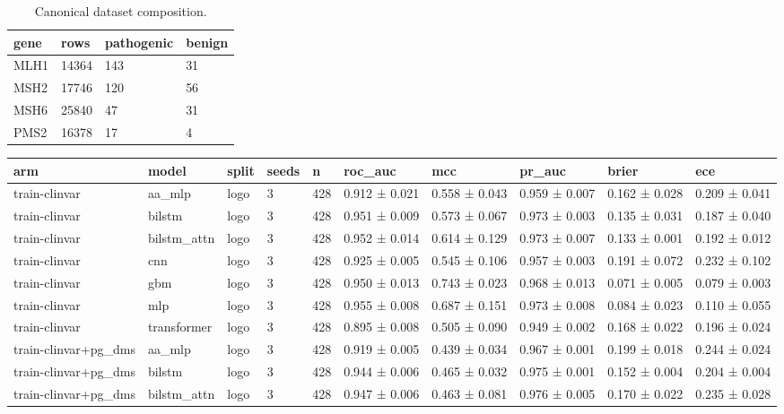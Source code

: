 \begin{table}[t]
\centering
\small
\begin{tabular}{llll}
\toprule
gene & rows & pathogenic & benign \\
\midrule
MLH1 & 14364 & 143 & 31 \\
MSH2 & 17746 & 120 & 56 \\
MSH6 & 25840 & 47 & 31 \\
PMS2 & 16378 & 17 & 4 \\
\bottomrule
\end{tabular}
\caption{Canonical dataset composition.}
\label{tab:composition}
\end{table}

\begin{table}[t]
\centering
\small
\begin{tabular}{llllllllll}
\toprule
arm & model & split & seeds & n & roc\_auc & mcc & pr\_auc & brier & ece \\
\midrule
train-clinvar & aa\_mlp & logo & 3 & 428 & 0.912 ± 0.021 & 0.558 ± 0.043 & 0.959 ± 0.007 & 0.162 ± 0.028 & 0.209 ± 0.041 \\
train-clinvar & bilstm & logo & 3 & 428 & 0.951 ± 0.009 & 0.573 ± 0.067 & 0.973 ± 0.003 & 0.135 ± 0.031 & 0.187 ± 0.040 \\
train-clinvar & bilstm\_attn & logo & 3 & 428 & 0.952 ± 0.014 & 0.614 ± 0.129 & 0.973 ± 0.007 & 0.133 ± 0.001 & 0.192 ± 0.012 \\
train-clinvar & cnn & logo & 3 & 428 & 0.925 ± 0.005 & 0.545 ± 0.106 & 0.957 ± 0.003 & 0.191 ± 0.072 & 0.232 ± 0.102 \\
train-clinvar & gbm & logo & 3 & 428 & 0.950 ± 0.013 & 0.743 ± 0.023 & 0.968 ± 0.013 & 0.071 ± 0.005 & 0.079 ± 0.003 \\
train-clinvar & mlp & logo & 3 & 428 & 0.955 ± 0.008 & 0.687 ± 0.151 & 0.973 ± 0.008 & 0.084 ± 0.023 & 0.110 ± 0.055 \\
train-clinvar & transformer & logo & 3 & 428 & 0.895 ± 0.008 & 0.505 ± 0.090 & 0.949 ± 0.002 & 0.168 ± 0.022 & 0.196 ± 0.024 \\
train-clinvar+pg\_dms & aa\_mlp & logo & 3 & 428 & 0.919 ± 0.005 & 0.439 ± 0.034 & 0.967 ± 0.001 & 0.199 ± 0.018 & 0.244 ± 0.024 \\
train-clinvar+pg\_dms & bilstm & logo & 3 & 428 & 0.944 ± 0.006 & 0.465 ± 0.032 & 0.975 ± 0.001 & 0.152 ± 0.004 & 0.204 ± 0.004 \\
train-clinvar+pg\_dms & bilstm\_attn & logo & 3 & 428 & 0.947 ± 0.006 & 0.463 ± 0.081 & 0.976 ± 0.005 & 0.170 ± 0.022 & 0.235 ± 0.028 \\

\end{tabular}
\end{table}
